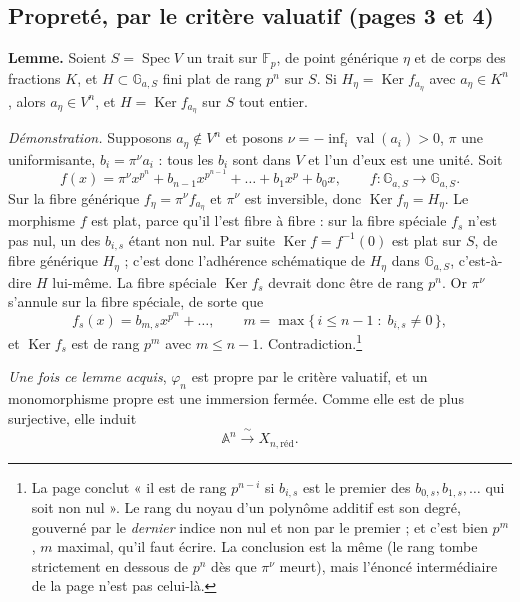 \documentclass[11pt,a4paper]{article}
\begin{document}
\subsection*{Propreté, par le critère valuatif (pages 3 et 4)}

\textbf{Lemme.} Soient $S = \operatorname{Spec} V$ un trait sur
$\mathbb{F}_p$, de point générique $\eta$ et de corps des fractions $K$, et
$H \subset \mathbb{G}_{a,S}$ fini plat de rang $p^n$ sur $S$. Si
$H_\eta = \operatorname{Ker} f_{a_\eta}$ avec $a_\eta \in K^n$, alors
$a_\eta \in V^n$, et $H = \operatorname{Ker} f_{a_\eta}$ sur $S$ tout entier.

\emph{Démonstration.} Supposons $a_\eta \notin V^n$ et posons
$\nu = -\inf_i \operatorname{val}(a_i) > 0$, $\pi$ une uniformisante,
$b_i = \pi^\nu a_i$ : tous les $b_i$ sont dans $V$ et l'un d'eux est une
unité. Soit
\[
  f(x) = \pi^\nu x^{p^n} + b_{n-1}x^{p^{n-1}} + \dots + b_1 x^p + b_0 x ,
  \qquad f : \mathbb{G}_{a,S} \to \mathbb{G}_{a,S} .
\]
Sur la fibre générique $f_\eta = \pi^\nu f_{a_\eta}$ et $\pi^\nu$ est
inversible, donc $\operatorname{Ker} f_\eta = H_\eta$. Le morphisme $f$ est
plat, parce qu'il l'est fibre à fibre : sur la fibre spéciale $f_s$ n'est pas
nul, un des $b_{i,s}$ étant non nul. Par suite
$\operatorname{Ker} f = f^{-1}(0)$ est plat sur $S$, de fibre générique
$H_\eta$ ; c'est donc l'adhérence schématique de $H_\eta$ dans
$\mathbb{G}_{a,S}$, c'est-à-dire $H$ lui-même. La fibre spéciale
$\operatorname{Ker} f_s$ devrait donc être de rang $p^n$. Or $\pi^\nu$
s'annule sur la fibre spéciale, de sorte que
\[
  f_s(x) = b_{m,s} x^{p^m} + \dots , \qquad
  m = \max\{\, i \leqslant n-1 \;:\; b_{i,s} \neq 0 \,\} ,
\]
et $\operatorname{Ker} f_s$ est de rang $p^m$ avec $m \leqslant n - 1$.
Contradiction.\footnote{La page conclut « il est de rang $p^{n-i}$ si
$b_{i,s}$ est le premier des $b_{0,s}, b_{1,s}, \dots$ qui soit non nul ».
Le rang du noyau d'un polynôme additif est son degré, gouverné par le
\emph{dernier} indice non nul et non par le premier ; et c'est bien
$p^m$, $m$ maximal, qu'il faut écrire. La conclusion est la même (le rang
tombe strictement en dessous de $p^n$ dès que $\pi^\nu$ meurt), mais l'énoncé
intermédiaire de la page n'est pas celui-là.}

\emph{Une fois ce lemme acquis}, $\varphi_n$ est propre par le critère
valuatif, et un monomorphisme propre est une immersion fermée. Comme elle est
de plus surjective, elle induit
\[
  \mathbb{A}^n \xrightarrow{\ \sim\ } X_{n,\mathrm{réd}} .
\]
\end{document}
